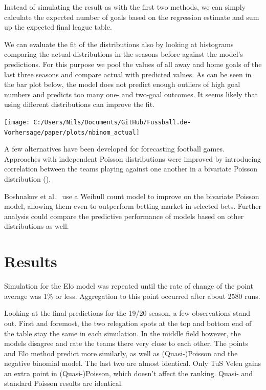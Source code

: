 \documentclass[12pt,a4paper]{article}
\begin{document}
Instead of simulating the result as with the first two methods, we can
simply calculate the expected number of goals based on the regression
estimate and sum up the expected final league table.

We can evaluate the fit of the distributions also by looking at
histograms comparing the actual distributions in the seasons before
against the model's predictions. For this purpose we pool the values of
all away and home goals of the last three seasons and compare actual
with predicted values. As can be seen in the bar plot below, the model
does not predict enough outliers of high goal numbers and predicts too
many one- and two-goal outcomes. It seems likely that using different
distributions can improve the fit.

\texttt{[image: C:/Users/Nils/Documents/GitHub/Fussball.de-Vorhersage/paper/plots/nbinom\_actual]}

A few alternatives have been developed for forecasting football games.
Approaches with independent Poisson distributions were improved by
introducing correlation between the teams playing against one another in
a bivariate Poisson distribution (\textcite{karlis2003}).

Boshnakov et al.~\autocite*{boshnakov2016} use a Weibull count model to
improve on the bivariate Poisson model, allowing them even to outperform
betting market in selected bets. Further analysis could compare the
predictive performance of models based on other distributions as well.

\hypertarget{results}{%
\section{Results}\label{results}}

Simulation for the Elo model was repeated until the rate of change of
the point average was 1\% or less. Aggregation to this point occurred
after about 2580 runs.

Looking at the final predictions for the 19/20 season, a few
observations stand out. First and foremost, the two relegation spots at
the top and bottom end of the table stay the same in each simulation. In
the middle field however, the models disagree and rate the teams there
very close to each other. The points and Elo method predict more
similarly, as well as (Quasi-)Poisson and the negative binomial model.
The last two are almost identical. Only TuS Velen gains an extra point
in (Quasi-)Poisson, which doesn't affect the ranking. Quasi- and
standard Poisson results are identical.
\end{document}
